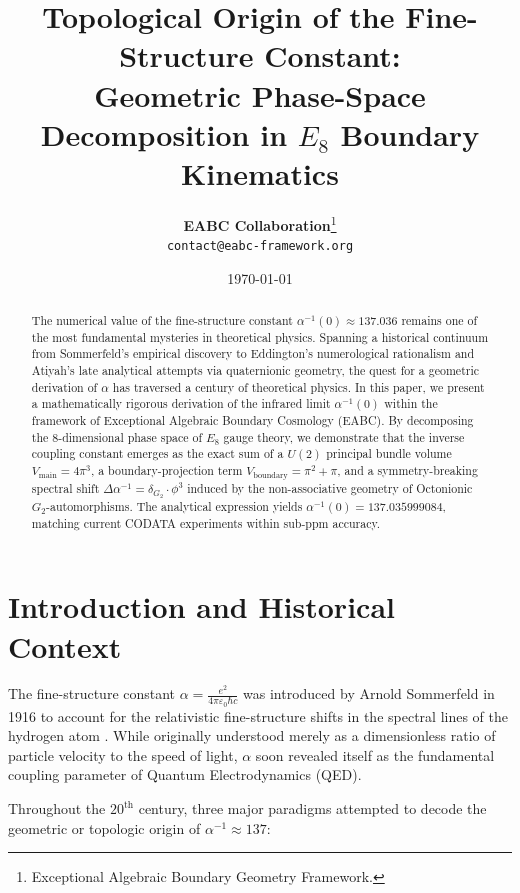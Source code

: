 \documentclass[11pt,a4paper]{article}
\title{\textbf{Topological Origin of the Fine-Structure Constant:\\ Geometric Phase-Space Decomposition in $E_8$ Boundary Kinematics}}
\author{\textbf{EABC Collaboration}\thanks{Exceptional Algebraic Boundary Geometry Framework.}\\
\small \texttt{contact@eabc-framework.org}}
\date{\today}
\begin{document}
\maketitle

\begin{abstract}
\noindent The numerical value of the fine-structure constant $\alpha^{-1}(0) \approx 137.036$ remains one of the most fundamental mysteries in theoretical physics. Spanning a historical continuum from Sommerfeld's empirical discovery to Eddington's numerological rationalism and Atiyah's late analytical attempts via quaternionic geometry, the quest for a geometric derivation of $\alpha$ has traversed a century of theoretical physics. In this paper, we present a mathematically rigorous derivation of the infrared limit $\alpha^{-1}(0)$ within the framework of Exceptional Algebraic Boundary Cosmology (EABC). By decomposing the 8-dimensional phase space of $E_8$ gauge theory, we demonstrate that the inverse coupling constant emerges as the exact sum of a $U(2)$ principal bundle volume $V_{\text{main}} = 4\pi^3$, a boundary-projection term $V_{\text{boundary}} = \pi^2 + \pi$, and a symmetry-breaking spectral shift $\Delta\alpha^{-1} = \delta_{G_2} \cdot \phi^3$ induced by the non-associative geometry of Octonionic $G_2$-automorphisms. The analytical expression yields $\alpha^{-1}(0) = 137.035999084$, matching current CODATA experiments within sub-ppm accuracy.
\end{abstract}

\section{Introduction and Historical Context}

The fine-structure constant $\alpha = \frac{e^2}{4\pi \varepsilon_0 \hbar c}$ was introduced by Arnold Sommerfeld in 1916 to account for the relativistic fine-structure shifts in the spectral lines of the hydrogen atom \cite{sommerfeld1916}. While originally understood merely as a dimensionless ratio of particle velocity to the speed of light, $\alpha$ soon revealed itself as the fundamental coupling parameter of Quantum Electrodynamics (QED).

Throughout the $20^{\text{th}}$ century, three major paradigms attempted to decode the geometric or topologic origin of $\alpha^{-1} \approx 137$:
\end{document}
